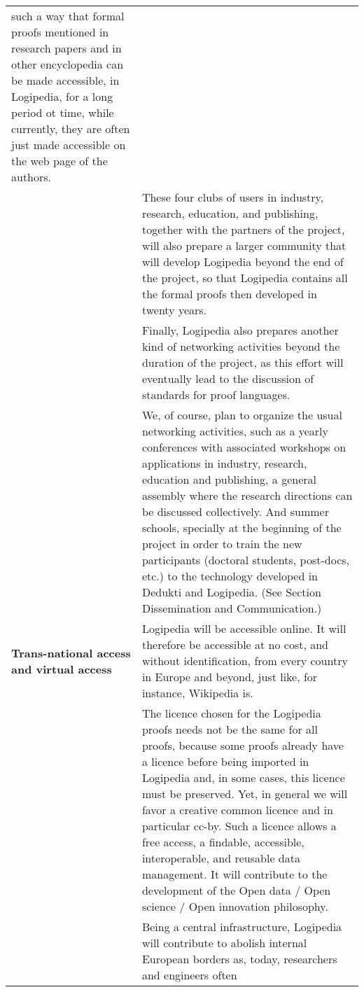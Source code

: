 \begin{longtable}{|p{}|p{}|}
such a way that formal proofs mentioned in research papers and in
other encyclopedia can be made accessible, in Logipedia, for a long
period ot time, while currently, they are often just made accessible
on the web page of the authors.\\
&
\hspace{0.4cm}
These four clubs of users in industry, research, education, and
publishing, together with the partners of the project, will also
prepare a larger community that will develop Logipedia beyond the end
of the project, so that Logipedia contains all the formal proofs then
developed in twenty years.\\
&
\hspace{0.4cm}
Finally, Logipedia also prepares another kind of networking activities
beyond the duration of the project, as this effort will eventually
lead to the discussion of standards for proof languages.\\
&
\hspace{0.4cm}
We, of course, plan to organize the usual networking activities,
such as a yearly conferences with associated workshops on applications
in industry, research, education and publishing, a general assembly
where the research directions can be discussed collectively. And
summer schools, specially at the beginning of the project in order to
train the new participants (doctoral students, post-docs, etc.) to the
technology developed in Dedukti and Logipedia.
(See Section Dissemination and Communication.)\\  
\hline
{\bf Trans-national access and virtual access}
&
Logipedia will be accessible online. It will therefore be accessible
at no cost, and without identification, from every country in Europe
and beyond, just like, for instance, Wikipedia is.\\
&
\hspace{0.4cm}
The licence chosen for the Logipedia proofs needs not be the same for
all proofs, because some proofs already have a licence before being
imported in Logipedia and, in some cases, this licence must be
preserved.  Yet, in general we will favor a creative common licence
and in particular cc-by.  Such a licence allows a free
access, a findable, accessible, interoperable, and reusable
data management. It will contribute to the development of the Open
data / Open science / Open innovation philosophy.\\
&
\hspace{0.4cm}
Being a central infrastructure, Logipedia will contribute to abolish
internal European borders as, today, researchers and engineers often

\end{longtable}
